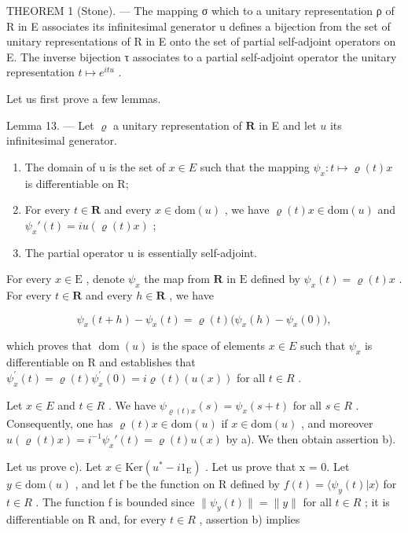 THEOREM 1 (Stone). --- The mapping σ which to a unitary representation ρ of R in E associates its infinitesimal generator u defines a bijection from the set of unitary representations of R in E onto the set of partial self-adjoint operators on E. The inverse bijection τ associates to a partial self-adjoint operator the unitary representation \(t \mapsto e^{itu}\) .

Let us first prove a few lemmas.

Lemma 13. --- Let \(\varrho\) a unitary representation of \(\mathbf{R}\) in E and let \(u\) its infinitesimal generator.

\begin{enumerate}
\def\labelenumi{\alph{enumi})}
\item
  The domain of u is the set of \(x \in E\) such that the mapping \(\psi_{x} \colon t \mapsto \varrho(t)x\) is differentiable on R;
\item
  For every \(t \in \mathbf{R}\) and every \(x \in \mathrm{dom}(u)\) , we have \(\varrho(t)x \in \mathrm{dom}(u)\) and \(\psi_x'(t) = i u(\varrho(t)x)\) ;
\item
  The partial operator u is essentially self-adjoint.
\end{enumerate}

For every \(x \in \mathrm{E}\) , denote \(\psi_x\) the map from \(\mathbf{R}\) in \(\mathrm{E}\) defined by \(\psi_x(t) = \varrho(t)x\) . For every \(t \in \mathbf{R}\) and every \(h \in \mathbf{R}\) , we have

\[
\psi_ {x} (t + h) - \psi_ {x} (t) = \varrho (t) \big (\psi_ {x} (h) - \psi_ {x} (0) \big),
\]

which proves that \(\operatorname{dom}(u)\) is the space of elements \(x \in E\) such that \(\psi_{x}\) is differentiable on R and establishes that \(\psi_{x}^{\prime}(t) = \varrho(t)\psi_{x}^{\prime}(0) = i\varrho(t)(u(x))\) for all \(t \in R\) .

Let \(x \in E\) and \(t \in R\) . We have \(\psi_{\varrho(t)x}(s) = \psi_x(s + t)\) for all \(s \in R\) . Consequently, one has \(\varrho(t)x \in \text{dom}(u)\) if \(x \in \text{dom}(u)\) , and moreover \(u(\varrho(t)x) = i^{-1}\psi_x'(t) = \varrho(t)u(x)\) by a). We then obtain assertion b).

Let us prove c). Let \(x \in \text{Ker}(u^{*} - i1_{\text{E}})\) . Let us prove that x = 0. Let \(y \in \text{dom}(u)\) , and let f be the function on R defined by \(f(t) = \langle \psi_{y}(t) | x \rangle\) for \(t \in R\) . The function f is bounded since \(\| \psi_{y}(t) \| = \| y \|\) for all \(t \in R\) ; it is differentiable on R and, for every \(t \in R\) , assertion b) implies

